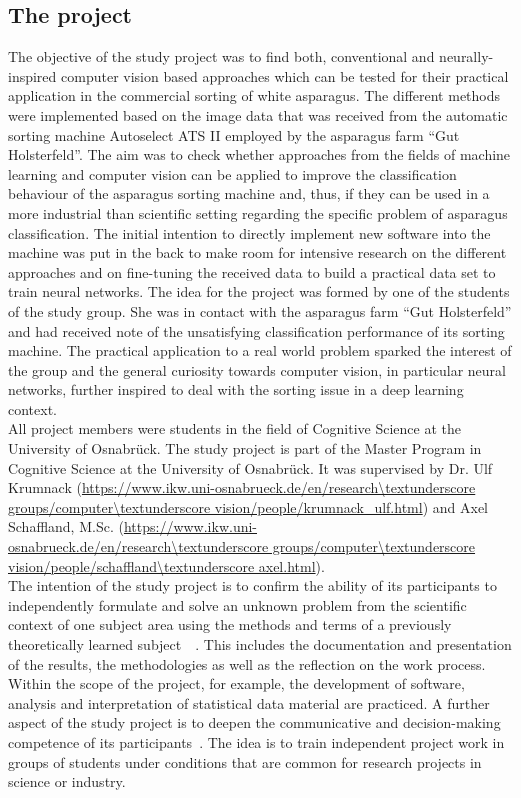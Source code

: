 \subsection{The project}

The objective of the study project was to find both, conventional and neurally-inspired computer vision based approaches which can be tested for their practical application in the commercial sorting of white asparagus. The different methods were implemented based on the image data that was received from the automatic sorting machine Autoselect ATS II employed by the asparagus farm “Gut Holsterfeld”. The aim was to check whether approaches from the fields of machine learning and computer vision can be applied to improve the classification behaviour of the asparagus sorting machine and, thus, if they can be used in a more industrial than scientific setting regarding the specific problem of asparagus classification. The initial intention to directly implement new software into the machine was put in the back to make room for intensive research on the different approaches and on fine-tuning the received data to build a practical data set to train neural networks.
The idea for the project was formed by one of the students of the study group. She was in contact with the asparagus farm “Gut Holsterfeld” and had received note of the unsatisfying classification performance of its sorting machine. The practical application to a real world problem sparked the interest of the group and the general curiosity towards computer vision, in particular neural networks, further inspired to deal with the sorting issue in a deep learning context. \\
All project members were students in the field of Cognitive Science at the University of Osnabrück. The study project is part of the Master Program in Cognitive Science at the University of Osnabrück. It was supervised by Dr. Ulf Krumnack (\url{https://www.ikw.uni-osnabrueck.de/en/research\textunderscore groups/computer\textunderscore vision/people/krumnack_ulf.html}) and Axel Schaffland, M.Sc. (\url{https://www.ikw.uni-osnabrueck.de/en/research\textunderscore groups/computer\textunderscore vision/people/schaffland\textunderscore axel.html}). \\
The intention of the study project is to confirm the ability of its participants to independently formulate and solve an unknown problem from the scientific context of one subject area using the methods and terms of a previously theoretically learned subject~\citep{studyregulations}~\citep{moduledescription}. This includes the documentation and presentation of the results, the methodologies as well as the reflection on the work process. Within the scope of the project, for example, the development of software, analysis and interpretation of statistical data material are practiced. A further aspect of the study project is to deepen the communicative and decision-making competence of its participants~\citep{moduledescription}. The idea is to train independent project work in groups of students under conditions that are common for research projects in science or industry. \\
